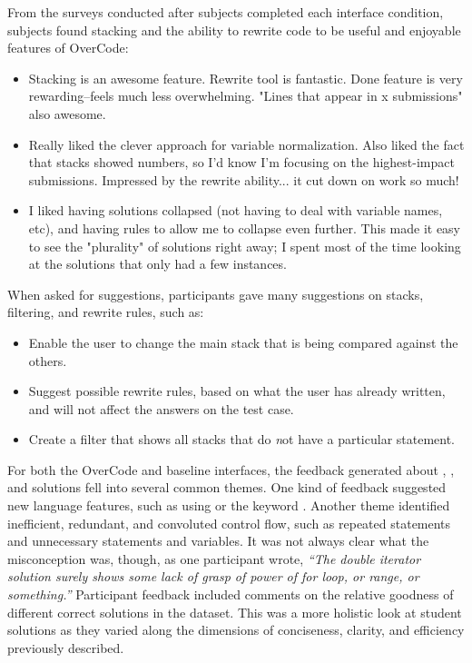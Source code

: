 From the surveys conducted after subjects completed each interface condition, subjects found stacking and the ability to rewrite code to be useful and enjoyable features of OverCode:
\begin{itemize}
\item Stacking is an awesome feature. Rewrite tool is fantastic. Done feature is very rewarding--feels much less overwhelming. "Lines that appear in x submissions" also awesome.

\item Really liked the clever approach for variable normalization. Also liked the fact that stacks showed numbers, so I'd know I'm focusing on the highest-impact submissions. Impressed by the rewrite ability... it cut down on work so much!

\item I liked having solutions collapsed (not having to deal with variable names, etc), and having rules to allow me to collapse even further. This made it easy to see the "plurality" of solutions right away; I spent most of the time looking at the solutions that only had a few instances.
\end{itemize}

When asked for suggestions, participants gave many suggestions on stacks, filtering, and rewrite rules, such as:
\begin{itemize}

\item Enable the user to change the main stack that is being compared against the others.
\item Suggest possible rewrite rules, based on what the user has already written, and will not affect the answers on the test case.
\item Create a filter that shows all stacks that do {\emph not} have a particular statement.
\end{itemize}

For both the OverCode and baseline interfaces, the feedback generated about , , and  solutions fell into several common themes. One kind of feedback suggested new language features, such as using \codevar{*=} or the keyword . Another theme identified inefficient, redundant, and convoluted control flow, such as repeated statements and unnecessary statements and variables. It was not always clear what the misconception was, though, as one participant wrote, \textit{``The double iterator solution surely shows some lack of grasp of power of for loop, or range, or something.''} Participant feedback included comments on the relative goodness of different correct solutions in the dataset. This was a more holistic look at student solutions as they varied along the dimensions of conciseness, clarity, and efficiency previously described.

